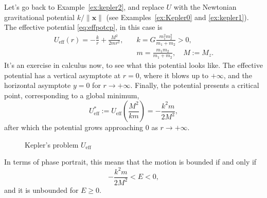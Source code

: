 \documentclass[english,fontsize=11pt,paper=a5,oneside]{scrbook}
\newcommand{\bx}{\bm{x}}
\theoremstyle{definition}
\begin{document}
Let's go back to Example~\ref{ex:kepler2}, and replace $U$ with the Newtonian gravitational potential $k/\|\bx\|$ (see Examples~\ref{ex:Kepler0} and \ref{ex:kepler1}).
The effective potential \eqref{eq:effpotcp}, in this case is
\begin{align}
  U_{\mathrm{eff}} (r) = -\frac kr + \frac {M^2}{2 m r^2}, \quad & k = G \frac{m_1^2 m_2^2}{m_1+m_2} > 0,      \\
                                                                 & m = \frac{m_1m_2}{m_1+m_2}, \quad M := M_z.
\end{align}
It's an exercise in calculus now, to see what this potential looks like.
The effective potential has a vertical asymptote at $r=0$, where it blows up to $+\infty$,
and the horizontal asymptote $y=0$ for $r\to+\infty$.
Finally, the potential presents a critical point, corresponding to a global minimum,
\begin{equation}
  U_{\mathrm{eff}}^* := U_{\mathrm{eff}}\left(\frac{M^2}{k m}\right) = - \frac{k^2m}{2M^2},
\end{equation}
after which the potential grows approaching $0$ as $r\to+\infty$.

\begin{figure}[th]
  \centering
  \label{fig:KeplerVeff}
  \caption{Kepler's problem $U_{\mathrm{eff}}$}
\end{figure}
In terms of phase portrait, this means that the motion is bounded if and only if
\begin{equation}
  - \frac{k^2 m}{2 M^2} < E < 0,
\end{equation}
and it is unbounded for $E \geq 0$.
\end{document}
